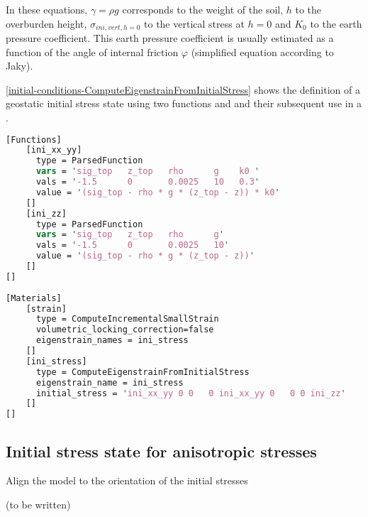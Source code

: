 In these equations, $\gamma=\rho g$ corresponds to the weight of the soil, $h$
to the overburden height, $\sigma_{ini,vert,h=0}$ to the vertical stress at
$h=0$ and $K_0$ to the earth pressure coefficient. This earth pressure
coefficient is usually estimated as a function of the angle of internal
friction $\varphi$ (simplified equation according to Jaky).

\autoref{initial-conditions-ComputeEigenstrainFromInitialStress} shows the
definition of a geostatic initial stress state using two functions
 and  and their subsequent use in a
.

\begin{lstlisting}[language=perl, float, caption={Definition of a geostatic initial stress state using ‘ComputeEigenstrainFromInitialStress’ },label={initial-conditions-ComputeEigenstrainFromInitialStress}]
[Functions]
    [ini_xx_yy]
      type = ParsedFunction
      vars = 'sig_top   z_top   rho      g    k0 '
      vals = '-1.5      0       0.0025   10   0.3'
      value = '(sig_top - rho * g * (z_top - z)) * k0'
    []
    [ini_zz]
      type = ParsedFunction
      vars = 'sig_top   z_top   rho      g'
      vals = '-1.5      0       0.0025   10'
      value = '(sig_top - rho * g * (z_top - z))'
    []
[]
  
[Materials]
    [strain]
      type = ComputeIncrementalSmallStrain
      volumetric_locking_correction=false
      eigenstrain_names = ini_stress
    []
    [ini_stress]
      type = ComputeEigenstrainFromInitialStress
      eigenstrain_name = ini_stress
      initial_stress = 'ini_xx_yy 0 0   0 ini_xx_yy 0   0 0 ini_zz'
    []
[]
\end{lstlisting}

\subsection{Initial stress state for anisotropic stresses}
\label{chap:IC-stress-state-anisotropic}

Align the model to the orientation of the initial stresses

(to be written)
